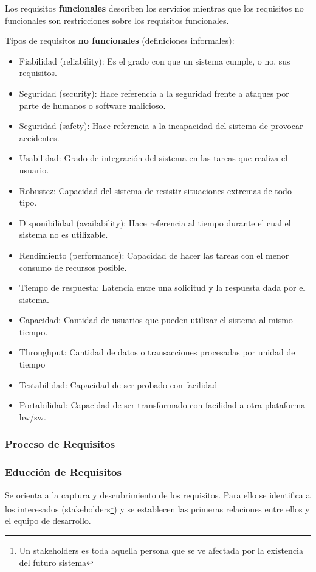 Los requisitos \textbf{funcionales} describen los servicios mientras que los
requisitos no funcionales son restricciones sobre los requisitos
funcionales.

Tipos de requisitos \textbf{no funcionales} (definiciones informales):
\begin{itemize}[noitemsep]
\item Fiabilidad (reliability): Es el grado con que un sistema cumple, o no, sus requisitos.
\item Seguridad (security): Hace referencia a la seguridad frente a ataques por parte de humanos o software malicioso.
\item Seguridad (safety): Hace referencia a la incapacidad del sistema de provocar accidentes.
\item Usabilidad: Grado de integración del sistema en las tareas que realiza el usuario.
\item Robustez: Capacidad del sistema de resistir situaciones extremas de todo tipo.
\item Disponibilidad (availability): Hace referencia al tiempo durante el cual el sistema no es utilizable.
\item Rendimiento (performance): Capacidad de hacer las tareas con el menor consumo de recursos posible.
\item Tiempo de respuesta: Latencia entre una solicitud y la respuesta dada por el sistema.
\item Capacidad: Cantidad de usuarios que pueden utilizar el sistema al mismo tiempo.
\item Throughput: Cantidad de datos o transacciones procesadas por unidad de tiempo
\item Testabilidad: Capacidad de ser probado con facilidad
\item Portabilidad: Capacidad de ser transformado con facilidad a otra plataforma hw/sw.
\end{itemize}

\subsubsection{Proceso de Requisitos}
\label{sec:proceso-de-requisitos}

\subsubsection{Educción de Requisitos}
\label{sec:educcion}

Se orienta a la captura y descubrimiento de los requisitos. Para ello
se identifica a los interesados (stakeholders\footnote{Un stakeholders
  es toda aquella persona que se ve afectada por la existencia del
  futuro sistema}) y se establecen las primeras relaciones entre ellos
y el equipo de desarrollo.

